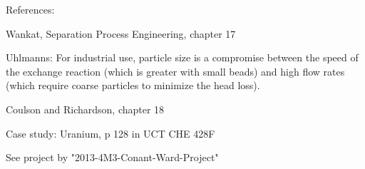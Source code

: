 References:

Wankat, Separation Process Engineering, chapter 17

Uhlmanns: For industrial use, particle size is a compromise between the speed of the exchange reaction (which is greater with small beads) and high flow rates (which require coarse particles to minimize the head loss).


Coulson and Richardson, chapter 18

Case study: Uranium, p 128 in UCT CHE 428F

See project by "2013-4M3-Conant-Ward-Project"